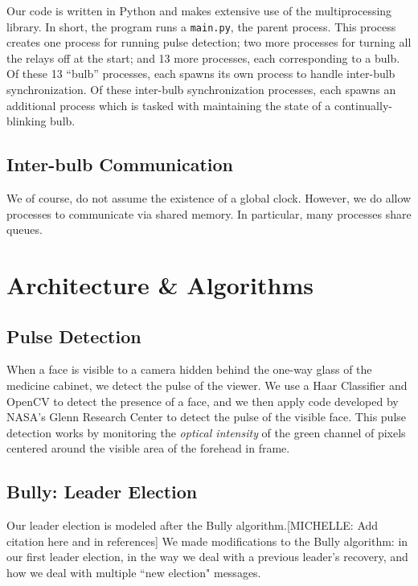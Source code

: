 \documentclass[preprint,review,12pt]{cs262}
\newcommand{\note}[3]{{\color{#2}[#1: #3]}}
\newcommand{\MICHELLE}[1]{\note{MICHELLE}{blue}{#1}}
\begin{document}
Our code is written in Python and makes extensive use of the multiprocessing library. In short, the program runs a \texttt{main.py}, the parent process. This process creates one process for running pulse detection; two more processes for turning all the relays off at the start; and 13 more processes, each corresponding to a bulb. Of these 13 ``bulb'' processes, each spawns its own process to handle inter-bulb synchronization. Of these inter-bulb synchronization processes, each spawns an additional process which is tasked with maintaining the state of a continually-blinking bulb. 

\subsection{Inter-bulb Communication}

We of course, do not assume the existence of a global clock. However, we do allow processes to communicate via shared memory. In particular, many processes share queues.  

\section{Architecture \& Algorithms}

\subsection{Pulse Detection} 

When a face is visible to a camera hidden behind the one-way glass of the medicine cabinet, we detect the pulse of the viewer. We use a Haar Classifier and OpenCV to detect the presence of a face, and we then apply code developed by NASA's Glenn Research Center\cite{NASA} to detect the pulse of the visible face. This pulse detection works by monitoring the \emph{optical intensity} of the green channel of pixels centered around the visible area of the forehead in frame. 

\subsection{Bully: Leader Election}

Our leader election is modeled after the Bully algorithm.\MICHELLE{Add citation here and in references} We made modifications to the Bully algorithm: in our first leader election, in the way we deal with a previous leader's recovery, and how we deal with multiple ``new election" messages.
\end{document}
